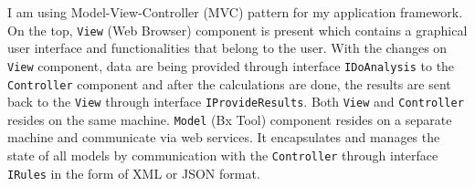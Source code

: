 I am using Model-View-Controller (MVC) pattern for my application framework. 
On the top, \texttt{View} (Web Browser) component is present which contains a graphical user interface and functionalities that belong to the user. With the changes on \texttt{View} component, data are being provided through interface \texttt{IDoAnalysis} to the \texttt{Controller} component and after the calculations are done, the results are sent back to the \texttt{View} through interface \texttt{IProvideResults}. Both \texttt{View} and \texttt{Controller} resides on the same machine.
\newline\newline \texttt{Model} (Bx Tool) component resides on a separate machine and communicate via web services. It encapsulates and manages the state of all models by communication with the \texttt{Controller} through interface \texttt{IRules} in the form of XML or JSON format.